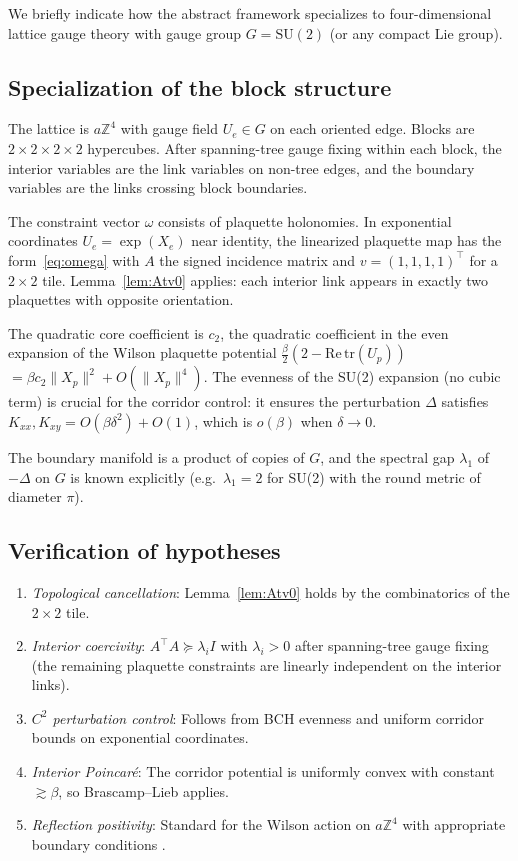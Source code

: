 \documentclass[11pt]{article}
\theoremstyle{definition}
\newcommand{\tr}{\mathrm{tr}}
\newcommand{\1}{\mathbf{1}}
\newcommand{\Z}{\mathbb{Z}}
\newcommand{\norm}[1]{\lVert #1\rVert}
\begin{document}
We briefly indicate how the abstract framework specializes to four-dimensional lattice gauge
theory with gauge group $G=\mathrm{SU}(2)$ (or any compact Lie group).

\subsection{Specialization of the block structure}

The lattice is $a\Z^4$ with gauge field $U_e\in G$ on each oriented edge.  Blocks are
$2\times 2\times 2\times 2$ hypercubes.  After spanning-tree gauge fixing within each block,
the interior variables are the link variables on non-tree edges, and the boundary variables
are the links crossing block boundaries.

The constraint vector $\omega$ consists of plaquette holonomies.  In exponential coordinates
$U_e=\exp(X_e)$ near identity, the linearized plaquette map has the form~\eqref{eq:omega}
with $A$ the signed incidence matrix and $v=(1,1,1,1)^\top$ for a $2\times 2$ tile.
Lemma~\ref{lem:Atv0} applies: each interior link appears in exactly two plaquettes with
opposite orientation.

The quadratic core coefficient is $c_2$, the quadratic coefficient in the even expansion
of the Wilson plaquette potential $\frac{\beta}{2}(2-\mathrm{Re}\,\tr(U_p))$
$=\beta c_2\norm{X_p}^2+O(\norm{X_p}^4)$.  The evenness of the SU(2) expansion (no cubic
term) is crucial for the corridor control: it ensures the perturbation $\Delta$ satisfies
$K_{xx},K_{xy}=O(\beta\delta^2)+O(1)$, which is $o(\beta)$ when $\delta\to 0$.

The boundary manifold is a product of copies of $G$, and the spectral gap $\lambda_1$ of
$-\Delta$ on $G$ is known explicitly (e.g.\ $\lambda_1=2$ for SU(2) with the round metric
of diameter $\pi$).

\subsection{Verification of hypotheses}

\begin{enumerate}[label=(\roman*)]
\item \emph{Topological cancellation}: Lemma~\ref{lem:Atv0} holds by the combinatorics
of the $2\times 2$ tile.
\item \emph{Interior coercivity}: $A^\top A\succeq\lambda_i I$ with $\lambda_i>0$
after spanning-tree gauge fixing (the remaining plaquette constraints are linearly
independent on the interior links).
\item \emph{$C^2$ perturbation control}: Follows from BCH evenness and uniform corridor
bounds on exponential coordinates.
\item \emph{Interior Poincar\'e}: The corridor potential is uniformly convex with
constant $\gtrsim\beta$, so Brascamp--Lieb applies.
\item \emph{Reflection positivity}: Standard for the Wilson action on $a\Z^4$ with
appropriate boundary conditions \cite{OsterwalderSeiler}.
\end{enumerate}
\end{document}

